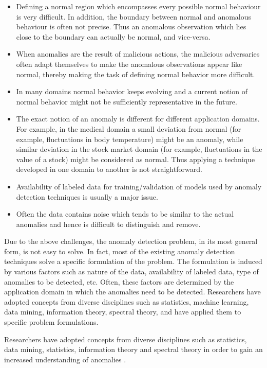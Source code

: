 \begin{itemize}
\item Defining a normal region which encompasses every possible normal behaviour 
is very difficult. In addition, the boundary between normal and anomalous 
behaviour is often not precise. Thus an anomalous observation which lies close
to the boundary can actually be normal, and vice-versa.
\item When anomalies are the result of malicious actions, the malicious 
adversaries often adapt themselves to make the anomalous observations appear 
like normal, thereby making the task of defining normal behavior more difficult.
\item In many domains normal behavior keeps evolving and a current notion of
normal behavior might not be sufficiently representative in the future.
\item The exact notion of an anomaly is different for different application 
domains. For example, in the medical domain a small deviation from normal (for
example, fluctuations in body temperature) might be an anomaly, while similar 
deviation in the stock market domain (for example, fluctuations in the value of 
a stock) might be considered as normal. Thus applying a technique developed in 
one domain to another is not straightforward.
\item Availability of labeled data for training/validation of models used by 
anomaly detection techniques is usually a major issue.
\item Often the data contains noise which tends to be similar to the actual 
anomalies and hence is difficult to distinguish and remove.
\end{itemize}

Due to the above challenges, the anomaly detection problem, in its most general
form, is not easy to solve. In fact, most of the existing anomaly detection 
techniques solve a specific formulation of the problem. The formulation is 
induced by various factors such as nature of the data, availability of labeled 
data, type of anomalies to be detected, etc. Often, these factors are determined
by the application domain in which the anomalies need to be detected. 
Researchers have adopted concepts from diverse disciplines such as statistics, 
machine learning, data mining, information theory, spectral theory, and have 
applied them to specific problem formulations.

Researchers have adopted concepts from diverse disciplines such as statistics, 
data mining, statistics, information theory and spectral theory in order to gain
an increased understanding of anomalies \cite{Chandola:2007}.

